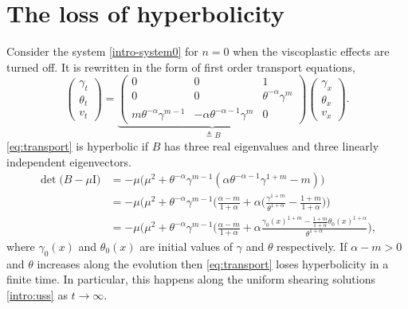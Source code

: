 \documentclass[a4paper,11pt]{article}
\theoremstyle{remark}
\begin{document}
\section{The loss of hyperbolicity} \label{append:hadamard}
Consider the system \eqref{intro-system0} for $n=0$ when the viscoplastic effects are turned off. It is rewritten in the form of  first order transport equations,
\begin{equation} \label{eq:transport}
 \begin{pmatrix} \gamma_t \\ \theta_t \\ v_t \end{pmatrix} = \underbrace{
 \begin{pmatrix}
  0 & 0 & 1\\
  0 & 0 & \theta^{-\alpha}\gamma^m \\
  m\theta^{-\alpha}\gamma^{m-1} & -\alpha\theta^{-\alpha-1}\gamma^m & 0 \end{pmatrix}}_\text{$\triangleq B$}
  \begin{pmatrix} \gamma_x \\ \theta_x \\ v_x \end{pmatrix}.
\end{equation}
\eqref{eq:transport} is hyperbolic if $B$ has three real eigenvalues and three linearly independent eigenvectors.
\begin{align*}
 \det\big(B-\mu\textrm{I}\big) &= -\mu\big(\mu^2+\theta^{-\alpha}\gamma^{m-1}(\alpha \theta^{-\alpha-1}\gamma^{1+m} - m)\big)\\
 &=-\mu\big(\mu^2+\theta^{-\alpha}\gamma^{m-1}\Big(\frac{\alpha-m}{1+\alpha}+\alpha \Big(\frac{\gamma^{1+m}}{\theta^{1+\alpha}} - \frac{1+m}{1+\alpha}\Big)\Big)\\
 &=-\mu\big(\mu^2+\theta^{-\alpha}\gamma^{m-1}\Big(\frac{\alpha-m}{1+\alpha}+\alpha \frac{\gamma_0(x)^{1+m} - \frac{1+m}{1+\alpha}\theta_0(x)^{1+\alpha}}{\theta^{1+\alpha}}\Big),
\end{align*}
where $\gamma_0(x)$ and $\theta_0(x)$ are initial values of $\gamma$ and $\theta$ respectively. If $\alpha-m>0$ and $\theta$ increases
along the evolution then \eqref{eq:transport} loses hyperbolicity in a finite time. In particular, this 
happens along the uniform shearing solutions \eqref{intro:uss}  as $t \rightarrow \infty$.
\end{document}

